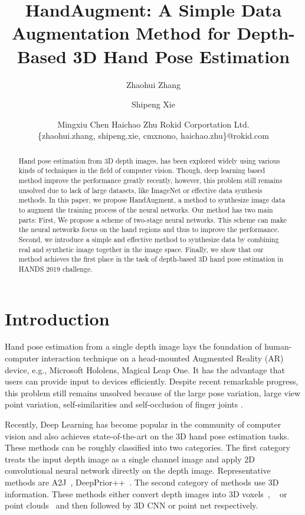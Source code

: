 \documentclass{article}
\title{HandAugment: A Simple Data Augmentation Method for Depth-Based 3D Hand Pose Estimation}
\author{
Zhaohui Zhang
\and
Shipeng Xie\and
Mingxiu Chen\And
Haichao Zhu
\affiliations
Rokid Corportation Ltd.\\
\emails
\{zhaohui.zhang, shipeng.xie, cmxnono, haichao.zhu\}@rokid.com
}
\begin{document}
\maketitle

\begin{abstract}
Hand pose estimation from 3D depth images, has been explored widely using various kinds of techniques in the field of computer vision. Though, deep learning based method improve the performance greatly recently, however, this problem still remains unsolved due to lack of large datasets, like ImageNet or effective data synthesis methods. In this paper, we propose HandAugment, a method to synthesize image data to augment the training process of the neural networks. Our method has two main parts: 
First, We propose a scheme of two-stage neural networks. This scheme can make the neural networks focus on the hand regions and thus to improve the performance.
Second, we introduce a simple and effective method to synthesize data by combining real and synthetic image together in the image space. 
Finally, we show that our method achieves the first place in the task of depth-based 3D hand pose estimation in HANDS 2019 challenge.
\end{abstract}

\section{Introduction}
Hand pose estimation from a single depth image lays the foundation of human-computer interaction
technique on a head-mounted Augmented Reality (AR) device,
e.g., Microsoft Hololens, Magical Leap One. It has the advantage that users can provide input to devices efficiently. 
Despite recent remarkable progress, this problem still remains unsolved because of the large pose variation, large view point variation, self-similarities and self-occlusion of finger joints .

Recently, Deep Learning has become popular in the community of computer vision and also achieves state-of-the-art on the 3D hand pose estimation tasks. These methods can be roughly classified into two categories. The first category treats the input depth image as a single channel image and apply 2D convolutional neural network directly on the depth image. Representative methods are A2J~\cite{xiong2019a2j}, DeepPrior++~\cite{oberweger2017deepprior++}. The second category of methods use 3D information. These methods either convert depth images into 3D voxels~\cite{moon2018v2v}, ~\cite{ge20173d} or point clouds~\cite{ge2018hand} and then followed by 3D CNN or point net respectively.
\end{document}
